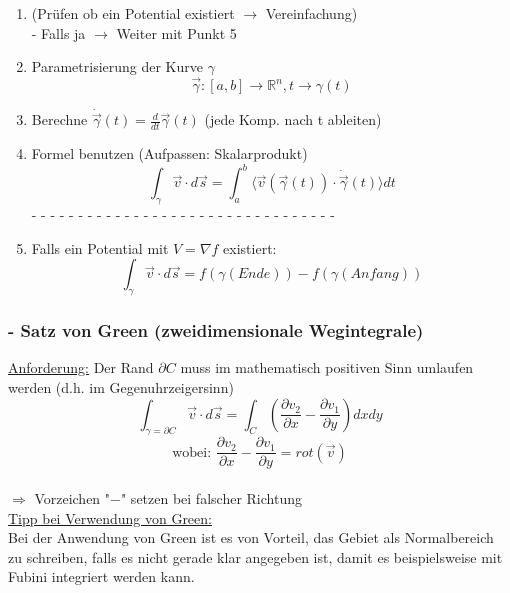\documentclass[6pt]{article}
\begin{document}
\begin{multicols*}{3}
		\begin{enumerate}
			\item 	(Pr{\"u}fen ob ein Potential existiert $\rightarrow$ Vereinfachung) \\
						- Falls ja $\rightarrow $ Weiter mit Punkt 5
			\item	Parametrisierung der Kurve $\gamma$ \\
						\[
						\vec{\gamma} : [a,b] \rightarrow \mathbb{R}^n, t \rightarrow \gamma(t)
						\]
			\item 	Berechne $\dot{\vec{\gamma}}(t) = \frac{d}{dt}\vec{\gamma}(t)$ (jede Komp. nach 		t ableiten)
			\item 	Formel benutzen (Aufpassen: Skalarprodukt)	\\
						\[
							\int_{\gamma} \vec{v} \cdot d\vec{s} = \int_{a}^{b} \langle\vec{v}(\vec{\gamma}(t)) \cdot \dot{\vec{\gamma}}(t)\rangle dt 
						\]
			- - - - - - - - - - - - - - - - - - - - - - - - - - - - - - - - - 
			\item 	Falls ein Potential mit $V = \nabla f$ existiert:\\
						\[
							\int_{\gamma} \vec{v} \cdot d\vec{s} = f(\gamma(Ende)) - f(\gamma(Anfang)) 		
						\]
		
		\end{enumerate}

		
		\subsubsection*{- Satz von Green (zweidimensionale Wegintegrale)}
		\underline{Anforderung:} Der Rand $\partial C$ muss im mathematisch positiven Sinn umlaufen werden (d.h. im Gegenuhrzeigersinn) \vspace{2mm}\\
		\[
				\int_{\gamma = \partial C} \vec{v} \cdot d\vec{s} = \int_{C} \left(\frac{\partial v_2}{\partial x} - \frac{\partial v_1}{\partial y} \right) dxdy
		\]
		\[
			\text{wobei: }\frac{\partial v_2}{\partial x} - \frac{\partial v_1}{\partial y} = rot(\vec{v})
		\]
		\vspace{-2mm}\\
		
		$\Rightarrow$ Vorzeichen "$-$" setzen bei falscher Richtung \\
			
		\underline{Tipp bei Verwendung von Green:} \vspace{1mm}\\
			Bei der Anwendung von Green ist es von Vorteil, das Gebiet als Normalbereich zu schreiben, falls es nicht gerade klar angegeben ist, damit es beispielsweise mit Fubini integriert werden kann.		
			

\end{multicols*}
\end{document}
